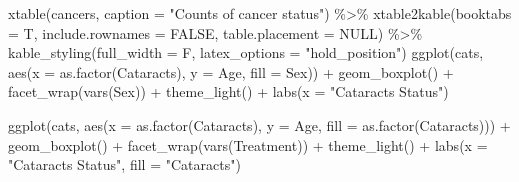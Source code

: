 \documentclass[12pt]{article}
\newenvironment{Shaded}{\begin{snugshade}}{\end{snugshade}}
\newcommand{\AttributeTok}[1]{\textcolor[rgb]{0.77,0.63,0.00}{#1}}
\newcommand{\ConstantTok}[1]{\textcolor[rgb]{0.00,0.00,0.00}{#1}}
\newcommand{\FunctionTok}[1]{\textcolor[rgb]{0.00,0.00,0.00}{#1}}
\newcommand{\NormalTok}[1]{#1}
\newcommand{\SpecialCharTok}[1]{\textcolor[rgb]{0.00,0.00,0.00}{#1}}
\newcommand{\StringTok}[1]{\textcolor[rgb]{0.31,0.60,0.02}{#1}}
\begin{document}
\begin{Shaded}
\begin{Highlighting}[]
\FunctionTok{xtable}\NormalTok{(cancers, }\AttributeTok{caption =} \StringTok{"Counts of cancer status"}\NormalTok{) }\SpecialCharTok{\%\textgreater{}\%}
  \FunctionTok{xtable2kable}\NormalTok{(}\AttributeTok{booktabs =}\NormalTok{ T, }\AttributeTok{include.rownames =} \ConstantTok{FALSE}\NormalTok{, }\AttributeTok{table.placement =} \ConstantTok{NULL}\NormalTok{) }\SpecialCharTok{\%\textgreater{}\%}
  \FunctionTok{kable\_styling}\NormalTok{(}\AttributeTok{full\_width =}\NormalTok{ F, }\AttributeTok{latex\_options =} \StringTok{"hold\_position"}\NormalTok{) }
\FunctionTok{ggplot}\NormalTok{(cats, }\FunctionTok{aes}\NormalTok{(}\AttributeTok{x =} \FunctionTok{as.factor}\NormalTok{(Cataracts), }\AttributeTok{y =}\NormalTok{ Age, }\AttributeTok{fill =}\NormalTok{ Sex)) }\SpecialCharTok{+} 
  \FunctionTok{geom\_boxplot}\NormalTok{() }\SpecialCharTok{+} \FunctionTok{facet\_wrap}\NormalTok{(}\FunctionTok{vars}\NormalTok{(Sex)) }\SpecialCharTok{+} 
  \FunctionTok{theme\_light}\NormalTok{() }\SpecialCharTok{+} 
  \FunctionTok{labs}\NormalTok{(}\AttributeTok{x =} \StringTok{"Cataracts Status"}\NormalTok{)}

\FunctionTok{ggplot}\NormalTok{(cats, }\FunctionTok{aes}\NormalTok{(}\AttributeTok{x =} \FunctionTok{as.factor}\NormalTok{(Cataracts), }\AttributeTok{y =}\NormalTok{ Age, }\AttributeTok{fill =} \FunctionTok{as.factor}\NormalTok{(Cataracts))) }\SpecialCharTok{+} 
  \FunctionTok{geom\_boxplot}\NormalTok{() }\SpecialCharTok{+} \FunctionTok{facet\_wrap}\NormalTok{(}\FunctionTok{vars}\NormalTok{(Treatment)) }\SpecialCharTok{+}
  \FunctionTok{theme\_light}\NormalTok{() }\SpecialCharTok{+} 
  \FunctionTok{labs}\NormalTok{(}\AttributeTok{x =} \StringTok{"Cataracts Status"}\NormalTok{, }\AttributeTok{fill =} \StringTok{"Cataracts"}\NormalTok{)}


\end{Highlighting}
\end{Shaded}
\end{document}
